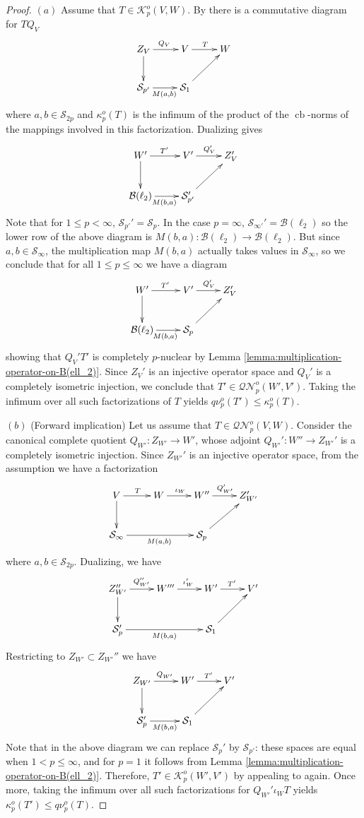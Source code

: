 \documentclass[11pt]{amsart}
\DeclareMathOperator{\cb}{cb}
\numberwithin{equation}{section}
\begin{document}
\begin{proof}
$(a)$ Assume that $T \in \mathcal{K}^o_p(V,W)$. By \cite[Prop. 3.8 and Thm. 2.8]{ChaDiGa-Operator-p-compact}
there is a commutative diagram for $TQ_V$
\[
\xymatrix{
Z_V \ar[r]^{Q_V} \ar[d] & V \ar[r]^T &W\\
\mathcal{S}_{p'} \ar[r]_{M(a,b)} &\mathcal{S}_1 \ar[ru] &
}
\]
where $a,b\in \mathcal{S}_{2p}$ and $\kappa^o_p(T)$ is the infimum of the product of the $\cb$-norms of the mappings involved in this factorization.
Dualizing gives
\[
\xymatrix{
W' \ar[r]^{T'} \ar[d] & V' \ar[r]^{Q_V'} &Z_V'\\
\mathcal{B}(\ell_2) \ar[r]_{M(b,a)} &\mathcal{S}_{p'}' \ar[ru] &
}
\]
Note that for $1 \le p < \infty$, $\mathcal{S}_{p'}'= \mathcal{S}_p$.
In the case $p=\infty$, $\mathcal{S}_{\infty'}'= \mathcal{B}(\ell_2)$ so the lower row of the above diagram is $M(b,a) : \mathcal{B}(\ell_2) \to \mathcal{B}(\ell_2)$. But since $a,b \in \mathcal{S}_\infty$, the multiplication map $M(b,a)$ actually takes values in $\mathcal{S}_\infty$, so we conclude that for all $1\le p \le \infty$ we have a diagram 
\[
\xymatrix{
W' \ar[r]^{T'} \ar[d] & V' \ar[r]^{Q_V'} &Z_V'\\
\mathcal{B}(\ell_2) \ar[r]_{M(b,a)} &\mathcal{S}_p \ar[ru] &
}
\]
showing that $Q_V'T'$ is completely $p$-nuclear by Lemma \ref{lemma:multiplication-operator-on-B(ell_2)}.
Since $Z_V'$ is an injective operator space and $Q_V'$ is a completely isometric injection, we conclude that $T' \in \mathcal{QN}^o_p(W',V')$. Taking the infimum over all such factorizations of $T$ yields $q\nu^o_p(T') \le \kappa^o_p(T)$.

 $(b)$ (Forward implication) Let us assume that $T \in \mathcal{QN}^o_p(V,W)$.
Consider the canonical complete quotient $Q_{W'} : Z_{W'} \to W'$, whose adjoint $Q_{W'}' : W'' \to Z_{W'}'$ is a completely isometric injection. Since $Z_{W'}'$ is an injective operator space, from the assumption we have a factorization
\[
\xymatrix{
V \ar[d] \ar[r]^T &W \ar[r]^{\iota_W} &W'' \ar[r]^{Q'_{W'}} &Z_{W'}'\\
\mathcal{S}_{\infty} \ar[rr]_{M(a,b)} & &\mathcal{S}_p \ar[ru] & 
}
\]
where $a,b\in \mathcal{S}_{2p}$.
Dualizing, we have
\[
\xymatrix{
Z_{W'}'' \ar[d] \ar[r]^{Q_{W'}''} &W''' \ar[r]^{\iota_W'} &W' \ar[r]^{T'}& V' \\
\mathcal S'_{p} \ar[rr]_{M(b,a)} & &\mathcal{S}_1 \ar[ru] & 
}
\]
Restricting to $Z_{W'} \subset Z_{W'}''$ we have 
\[
\xymatrix{
Z_{W'} \ar[d] \ar[r]^{Q_{W'}} &W' \ar[r]^{T'}& V' \\
\mathcal S'_{p} \ar[r]_{M(b,a)} & \mathcal{S}_1 \ar[ru] & 
}
\]
Note that in the above diagram we can replace $\mathcal{S}_p'$ by $\mathcal{S}_{p'}$: these spaces are equal when $1 < p \le \infty$, and for $p=1$ it follows from Lemma \ref{lemma:multiplication-operator-on-B(ell_2)}.
Therefore, $T' \in \mathcal{K}^o_p(W',V')$ by appealing to \cite[Prop. 3.8]{ChaDiGa-Operator-p-compact} again.
Once more, taking the infimum over all such factorizations for $Q_{W'}'{\iota_W}T$ yields $\kappa^o_p(T') \le q\nu_p^o(T)$.




\end{proof}
\end{document}
